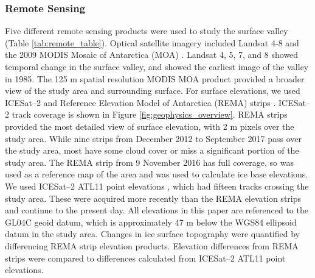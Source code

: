 \subsubsection{Remote Sensing} \label{sec:remote}

Five different remote sensing products were used to study the surface valley (Table \ref{tab:remote_table}). Optical satellite imagery included Landsat 4-8 \citep{RoyLandsat8Scienceproduct2014} and the 2009 MODIS Mosaic of Antarctica (MOA) \citep{haran2014modis}. Landsat 4, 5, 7, and 8 showed temporal change in the surface valley, and showed the earliest image of the valley in 1985. The 125 m spatial resolution MODIS MOA product provided a broader view of the study area and surrounding surface. For surface elevations, we used ICESat--2 and Reference Elevation Model of Antarctica (REMA) strips \citep{howat2019reference,smith2021v3}. ICESat--2 track coverage is shown in Figure \ref{fig:geophysics_overview}. REMA strips provided the most detailed view of surface elevation, with 2 m pixels over the study area. While nine strips from December 2012 to September 2017 pass over the study area, most have some cloud cover or miss a significant portion of the study area. The REMA strip from 9 November 2016 has full coverage, so was used as a reference map of the area and was used to calculate ice base elevations. We used ICESat--2 ATL11 point elevations \citep{smith2021v3}, which had fifteen tracks crossing the study area. These were acquired more recently than the REMA elevation strips and continue to the present day.   All elevations in this paper are referenced to the GL04C geoid datum, which is approximately 47 m below the WGS84 ellipsoid datum in the study area. Changes in ice surface topography were quantified by differencing REMA strip elevation products. Elevation differences from REMA strips were compared to differences calculated from ICESat--2 ATL11 point elevations.



